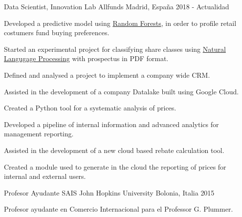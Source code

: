 

\begin{cventries}

\cventry
    {Data Scientist, Innovation Lab} %
    {Allfunds} %
    {Madrid, España} %
    {2018 - Actualidad} %
    {
        \begin{cvitems} %
            \item {Developed a predictive model using \href{https://en.wikipedia.org/wiki/Random_forest}{Random Forests}, in order to profile retail costumers fund buying preferences.}
            \item {Started an experimental project for classifying share classes using \href{https://en.wikipedia.org/wiki/Natural_language_processing}{Natural Langugage Processing} with prospectus in PDF format.}
            \item {Defined and analysed a project to implement a company wide CRM.}
            \item {Assisted in the development of a company Datalake built using Google Cloud.}
            \item {Created a Python tool for a systematic analysis of prices.}
            \item {Developed a pipeline of internal information and advanced analytics for management reporting.}
            \item {Assisted in the development of a new cloud based rebate calculation tool.}
            \item {Created a module used to generate in the cloud the reporting of prices for internal and external users.}
        \end{cvitems}
    }

\cventry
    {Profesor Ayudante} %
    {SAIS John Hopkins University} %
    {Bolonia, Italia} %
    {2015} %
    {
        \begin{cvitems} %
            \item {Profesor ayudante en Comercio Internacional para el Professor G. Plummer.}
        \end{cvitems}
    }


\end{cventries}
